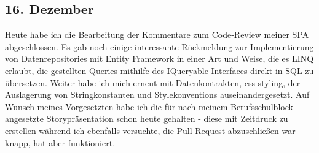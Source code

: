\subsection{16. Dezember}
Heute habe ich die Bearbeitung der Kommentare zum Code-Review meiner SPA abgeschlossen. Es gab noch einige interessante Rückmeldung zur Implementierung von Datenrepositories mit Entity Framework in einer Art und Weise, die es LINQ erlaubt, die gestellten Queries mithilfe des IQueryable-Interfaces direkt in SQL zu übersetzen. Weiter habe ich mich erneut mit Datenkontrakten, css styling, der Auslagerung von Stringkonstanten und Stylekonventions auseinandergesetzt. Auf Wunsch meines Vorgesetzten habe ich die für nach meinem Berufsschulblock angesetzte Storypräsentation schon heute gehalten - diese mit Zeitdruck zu erstellen während ich ebenfalls versuchte, die Pull Request abzuschließen war knapp, hat aber funktioniert.